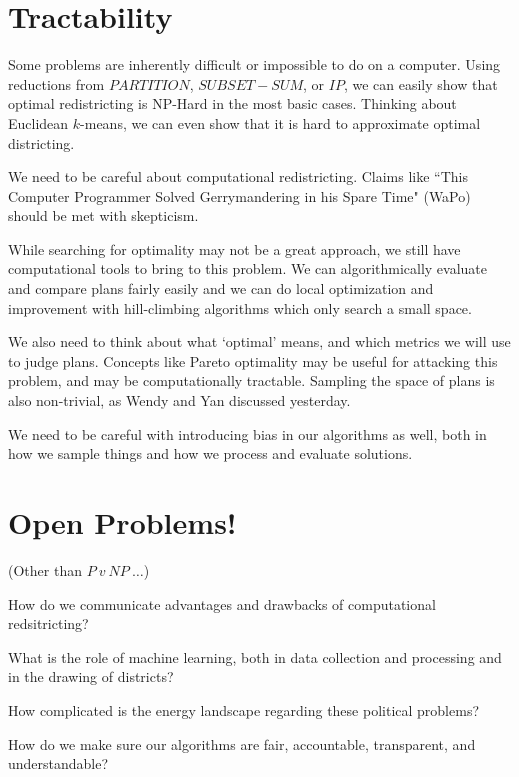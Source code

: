 \section*{Tractability}

Some problems are inherently difficult or impossible to do on a computer.  Using reductions from $PARTITION$, $SUBSET-SUM$, or $IP$, we can easily show that optimal redistricting is NP-Hard in the most basic cases.  Thinking about Euclidean $k$-means, we can even show that it is hard to approximate optimal districting.

We need to be careful about computational redistricting.  Claims like ``This Computer Programmer Solved Gerrymandering in his Spare Time" (WaPo) should be met with skepticism.

While searching for optimality may not be a great approach, we still have computational tools to bring to this problem.  We can algorithmically evaluate and compare plans fairly easily and we can do local optimization and improvement with hill-climbing algorithms which only search a small space.  

We also need to think about what `optimal' means, and which metrics we will use to judge plans.  Concepts like Pareto optimality may be useful for attacking this problem, and may be computationally tractable.  Sampling the space of plans is also non-trivial, as Wendy and Yan discussed yesterday.  

We need to be careful with introducing bias in our algorithms as well, both in how we sample things and how we process and evaluate solutions.



\section*{Open Problems!}

(Other than $P \ v \ NP \ \dots$)

How do we communicate advantages and drawbacks of computational redsitricting?

What is the role of machine learning, both in  data collection and processing and in the drawing of districts?

How complicated is the energy landscape regarding these political problems?

How do we make sure our algorithms are fair, accountable, transparent, and understandable?